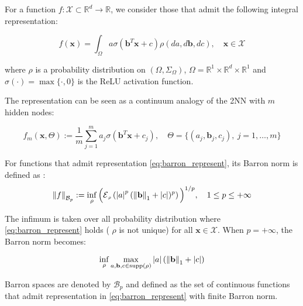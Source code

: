 For a function $f: \mathcal{X} \subset \mathbb{R}^d \to \mathbb{R}$, we consider
those that admit the following integral representation:

\begin{equation}\label{eq:barron_represent}
    f(\mathbf{x}) = \int_{\Omega} a \sigma(\mathbf{b}^T\mathbf{x} + c) \rho(da, d\mathbf{b}, dc), \quad \mathbf{x} \in \mathcal{X}
\end{equation}

where $\rho$ is a probability distribution on $(\Omega, \Sigma_\Omega)$, $\Omega
    = \mathbb{R}^1 \times \mathbb{R}^d \times \mathbb{R}^1$ and $\sigma(\cdot) =
    \max\{\cdot, 0\}$ is the ReLU activation function.

The representation can be seen as a continuum analogy of the 2NN with $m$ hidden
nodes:

\begin{equation}
    f_m(\mathbf{x}, \Theta) := \frac{1}{m} \sum_{j=1}^m a_j \sigma(\mathbf{b}^T\mathbf{x} + c_j), \quad \Theta = \{(a_j, \mathbf{b}_j, c_j), \ j = 1, \dots, m\}
\end{equation}

\begin{definition} For functions that admit representation
    \eqref{eq:barron_represent}, its Barron norm is defined as
    \cite{eBarronSpaceFlowinduced2021}:
    \begin{equation}\label{eq:barron_norm}
        \barronnorm{f}{p} := \inf_{\rho} \Big(\ERWi{\rho}{\abs{a}^p (\norm{\mathbf{b}}_1 + \abs{c})^p}\Big)^{1/p}, \quad 1 \leq p \leq +\infty
    \end{equation}
\end{definition}

The infimum is taken over all probability distribution where
\eqref{eq:barron_represent} holds ( $\rho$ is not unique) for all $\mathbf{x} \in
    \mathcal{X}$. When $p = + \infty$, the Barron norm becomes:

\begin{equation}
    \inf_{\rho} \max_{a, \mathbf{b}, c \in \operatorname{supp}(\rho)} \left| a \right| (\left\| \mathbf{b} \right\|_1 + \left| c \right|)
\end{equation}

Barron spaces are denoted by $\mathcal{B}_p$ and defined as the set of
\textit{}{continuous} functions that admit representation in
\eqref{eq:barron_represent} with finite Barron norm.

